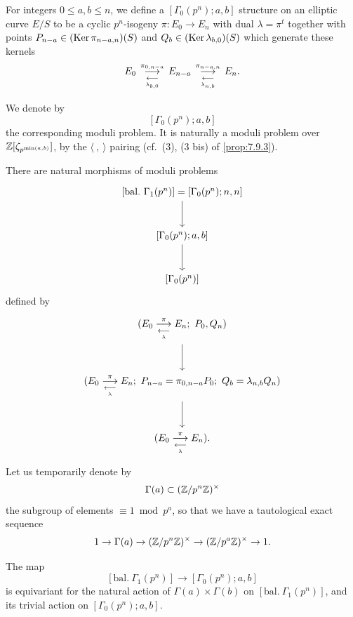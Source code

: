 \begin{definition}\label{def:7.9.4}
For integers $0 \leq a, b \leq n$, we define a $[\Gamma_0(p^n); a, b]$ structure on an elliptic curve $E/S$ to be a cyclic $p^n$-isogeny $\pi : E_0 \to E_n$ with dual $\lambda = \pi^t$ together with points $P_{n-a} \in (\operatorname{Ker} \pi_{n-a,n})(S)$ and $Q_b \in (\operatorname{Ker} \lambda_{b,0})(S)$ which generate these kernels
\[
E_0 \mathrel{ \mathop{\overset{\,\pi_{0,n-a}\,}{\longrightarrow}} \limits_{\underset{\,\lambda_{b,0}\,}{\longleftarrow}} } E_{n-a} \mathrel{ \mathop{\overset{\,\pi_{n-a,n}\,}{\longrightarrow}} \limits_{\underset{\,\lambda_{n,b}\,}{\longleftarrow}} } E_n .
\]
\end{definition}

We denote by
\begin{equation}\label{eq:7.9.4.1}
[\Gamma_0(p^n); a, b]
\end{equation}
the corresponding moduli problem. It is naturally a moduli problem over $\mathbb{Z}[\zeta_{p^{\min(a,b)}}]$, by the $\langle\ ,\ \rangle$ pairing (cf.\ (3), (3 bis) of \ref{prop:7.9.3}).

There are natural morphisms of moduli problems
\begin{equation}\label{eq:7.9.4.2}
\begin{tikzcd}[row sep=large]
{[\mathrm{bal.}\ \Gamma_1(p^n)] = [\Gamma_0(p^n); n, n]} \arrow[d] \\
{[\Gamma_0(p^n); a, b]} \arrow[d] \\
{[\Gamma_0(p^n)]}
\end{tikzcd}
\end{equation}
defined by
\begin{equation}\label{eq:7.9.4.3}
\begin{tikzcd}[row sep=large, every label/.append style={font=\scriptsize}]
{(E_0 \kmdual{\pi}{\lambda} E_n;\ P_0, Q_n)} \arrow[d] \\
{(E_0 \kmdual{\pi}{\lambda} E_n;\ P_{n-a} = \pi_{0,n-a}P_0;\ Q_b = \lambda_{n,b}Q_n)} \arrow[d] \\
{(E_0 \kmdual{\pi}{\lambda} E_n) .}
\end{tikzcd}
\end{equation}
Let us temporarily denote by
\begin{equation}\label{eq:7.9.4.4}
\Gamma(a) \subset (\mathbb{Z}/p^n\mathbb{Z})^\times
\end{equation}
the subgroup of elements $\equiv 1 \bmod p^a$, so that we have a tautological exact sequence
\[
1 \to \Gamma(a) \to (\mathbb{Z}/p^n\mathbb{Z})^\times \to (\mathbb{Z}/p^a\mathbb{Z})^\times \to 1 .
\]

\begin{klem}\label{lem:7.9.5}
The map
\[
[\mathrm{bal.}\ \Gamma_1(p^n)] \to [\Gamma_0(p^n); a, b]
\]
is equivariant for the natural action of $\Gamma(a) \times \Gamma(b)$ on $[\mathrm{bal.}\ \Gamma_1(p^n)]$, and its trivial action on $[\Gamma_0(p^n); a, b]$.
\end{klem}


